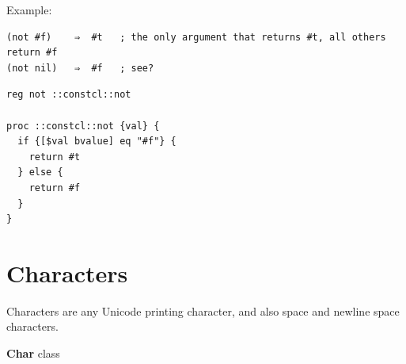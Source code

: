 \documentclass[twoside,9pt]{report}
\begin{document}
Example:

\noindent\makebox[\linewidth]{\rule{\linewidth}{0.4pt}}
\begin{lstlisting}
(not #f)    ⇒  #t   ; the only argument that returns #t, all others return #f
(not nil)   ⇒  #f   ; see?
\end{lstlisting}
\noindent\makebox[\linewidth]{\rule{\linewidth}{0.4pt}}
\noindent\makebox[\linewidth]{\rule{\linewidth}{0.4pt}}
\begin{lstlisting}
reg not ::constcl::not
 
proc ::constcl::not {val} {
  if {[$val bvalue] eq "#f"} {
    return #t
  } else {
    return #f
  }
}
\end{lstlisting}
\noindent\makebox[\linewidth]{\rule{\linewidth}{0.4pt}}
\section{Characters}
\label{characters}

Characters are any Unicode printing character, and also space and newline space characters.


\textbf{Char} class
\end{document}
